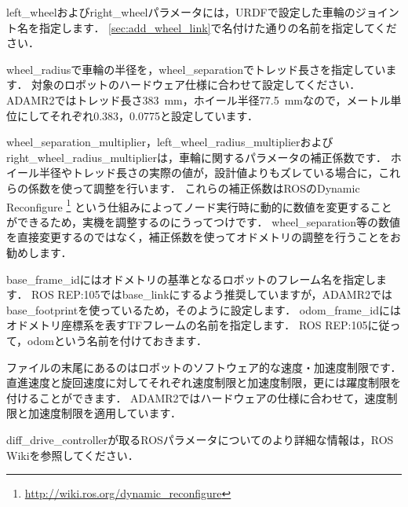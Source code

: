 \documentclass[{../../master}]{subfiles}
\begin{document}
\textsf{left\_wheel}および\textsf{right\_wheel}パラメータには，URDFで設定した車輪のジョイント名を指定します．
\ref{sec:add_wheel_link}で名付けた通りの名前を指定してください．

\textsf{wheel\_radius}で車輪の半径を，\textsf{wheel\_separation}でトレッド長さを指定しています．
対象のロボットのハードウェア仕様に合わせて設定してください．
ADAMR2ではトレッド長さ\SI{383}{mm}，ホイール半径\SI{77.5}{mm}なので，メートル単位にしてそれぞれ0.383，0.0775と設定しています．

\textsf{wheel\_separation\_multiplier}，\textsf{left\_wheel\_radius\_multiplier}および\textsf{right\_wheel\_radius\_multiplier}は，車輪に関するパラメータの補正係数です．
ホイール半径やトレッド長さの実際の値が，設計値よりもズレている場合に，これらの係数を使って調整を行います．
これらの補正係数はROSのDynamic Reconfigure
\footnote{\url{http://wiki.ros.org/dynamic_reconfigure}}
という仕組みによってノード実行時に動的に数値を変更することができるため，実機を調整するのにうってつけです．
\textsf{wheel\_separation}等の数値を直接変更するのではなく，補正係数を使ってオドメトリの調整を行うことをお勧めします．

\textsf{base\_frame\_id}にはオドメトリの基準となるロボットのフレーム名を指定します．
ROS REP:105では\textsf{base\_link}にするよう推奨していますが，ADAMR2では\textsf{base\_footprint}を使っているため，そのように設定します．
\textsf{odom\_frame\_id}にはオドメトリ座標系を表すTFフレームの名前を指定します．
ROS REP:105に従って，\textsf{odom}という名前を付けておきます．

ファイルの末尾にあるのはロボットのソフトウェア的な速度・加速度制限です．
直進速度と旋回速度に対してそれぞれ速度制限と加速度制限，更には躍度制限を付けることができます．
ADAMR2ではハードウェアの仕様に合わせて，速度制限と加速度制限を適用しています．

\textsf{diff\_drive\_controller}が取るROSパラメータについてのより詳細な情報は，ROS Wikiを参照してください．
\end{document}
